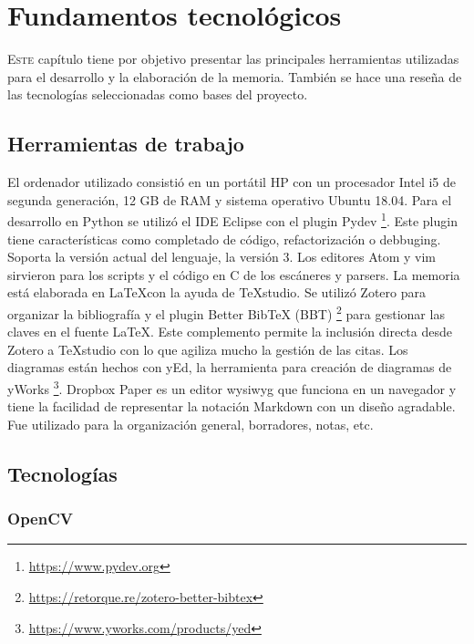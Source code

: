 
\chapter{Fundamentos tecnológicos}
\label{chap:fundamentos-tecnologicos}

\lettrine{E}{ste} capítulo tiene por objetivo presentar las principales herramientas utilizadas para el desarrollo y la elaboración de la memoria. También se hace una reseña de las tecnologías seleccionadas como bases del proyecto.

\section{Herramientas de trabajo}

El ordenador utilizado consistió en un portátil HP con un procesador Intel i5 de segunda generación, 12 GB de RAM y sistema operativo Ubuntu 18.04. Para el desarrollo en Python se utilizó el IDE Eclipse con el plugin Pydev
\footnote{\url{https://www.pydev.org}}. Este plugin tiene características como completado de código, refactorización o debbuging. Soporta la versión actual del lenguaje, la versión 3. Los editores Atom y vim sirvieron para los scripts y el código en C de los escáneres y parsers. La memoria está elaborada en \LaTeX con la ayuda de TeXstudio. Se utilizó Zotero para organizar la bibliografía y el plugin Better BibTeX (BBT) 
\footnote{\url{https://retorque.re/zotero-better-bibtex}} para gestionar las claves en el fuente \LaTeX. Este complemento permite la inclusión directa desde Zotero a TeXstudio con lo que agiliza mucho la gestión de las citas. Los diagramas están hechos con yEd, la herramienta para creación de diagramas de yWorks 
\footnote{\url{https://www.yworks.com/products/yed}}. Dropbox Paper es un editor \acrlong{wysiwyg} que funciona en un navegador y tiene la facilidad de representar la notación Markdown con un diseño agradable. Fue utilizado para la organización general, borradores, notas, etc.

\section{Tecnologías}

\subsection{OpenCV}

